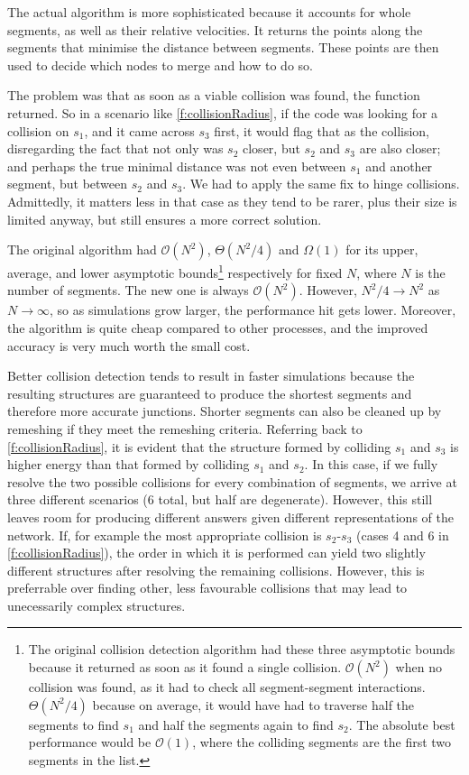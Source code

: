 The actual algorithm is more sophisticated because it accounts for whole segments, as well as their relative velocities. It returns the points along the segments that minimise the distance between segments. These points are then used to decide which nodes to merge and how to do so.

The problem was that as soon as a viable collision was found, the function returned. So in a scenario like \cref{f:collisionRadius}, if the code was looking for a collision on $s_1$, and it came across $s_3$ first, it would flag that as the collision, disregarding the fact that not only was $s_2$ closer, but $s_2$ and $s_3$ are also closer; and perhaps the true minimal distance was not even between $s_1$ and another segment, but between $s_2$ and $s_3$. We had to apply the same fix to hinge collisions. Admittedly, it matters less in that case as they tend to be rarer, plus their size is limited anyway, but still ensures a more correct solution.

The original algorithm had $\mathcal{O}(N^2)$, $\Theta(N^2/4)$ and $\Omega(1)$ for its upper, average, and lower asymptotic bounds\footnote{The original collision detection algorithm had these three asymptotic bounds because it returned as soon as it found a single collision. $\mathcal{O}(N^2)$ when no collision was found, as it had to check all segment-segment interactions. $\Theta(N^2/4)$ because on average, it would have had to traverse half the segments to find $s_1$ and half the segments again to find $s_2$. The absolute best performance would be $\mathcal{O}(1)$, where the colliding segments are the first two segments in the list.} respectively for fixed $N$, where $N$ is the number of segments. The new one is always $\mathcal{O}(N^2)$. However, $N^2/4 \to N^2$ as $N\to\infty$, so as simulations grow larger, the performance hit gets lower. Moreover, the algorithm is quite cheap compared to other processes, and the improved accuracy is very much worth the small cost.

Better collision detection tends to result in faster simulations because the resulting structures are guaranteed to produce the shortest segments and therefore more accurate junctions. Shorter segments can also be cleaned up by remeshing if they meet the remeshing criteria. Referring back to \cref{f:collisionRadius}, it is evident that the structure formed by colliding $s_1$ and $s_3$ is higher energy than that formed by colliding $s_1$ and $s_2$. In this case, if we fully resolve the two possible collisions for every combination of segments, we arrive at three different scenarios (6 total, but half are degenerate). However, this still leaves room for producing different answers given different representations of the network. If, for example the most appropriate collision is $s_2$-$s_3$ (cases 4 and 6 in \cref{f:collisionRadius}), the order in which it is performed can yield two slightly different structures after resolving the remaining collisions. However, this is preferrable over finding other, less favourable collisions that may lead to unecessarily complex structures.

